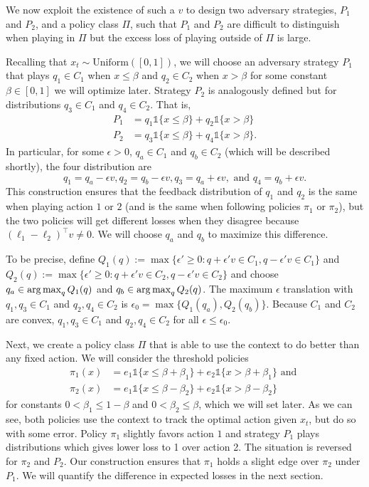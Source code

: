 \documentclass{article}
\begin{document}
We now exploit the existence of such a $v$ to design two adversary strategies, $P_1$ and $P_2$, and a policy class $\Pi$, such that $P_1$ and $P_2$ are difficult to distinguish when playing in $\Pi$ but the excess loss of playing outside of $\Pi$ is large.

Recalling that $x_t\sim\mathrm{Uniform}([0,1])$, we will choose an adversary strategy $P_1$ that plays $q_1\in C_1$ when  $x\leq \beta$ and $q_2 \in C_2$ when $x>\beta$ for some constant $\beta\in [0,1]$ we will optimize later. Strategy $P_2$ is analogously defined but for distributions $q_3 \in C_1$ and $q_4 \in C_2$. That is,
\begin{align*}
    P_1 &= q_1 \mathds{1}\{ x \leq \beta\} + q_2 \mathds{1}\{ x > \beta\}\\
    P_2 &= q_3 \mathds{1}\{ x \leq \beta\} + q_4 \mathds{1}\{ x > \beta\}.
\end{align*}
In particular, for some $\epsilon>0$, $q_a \in C_1$ and $q_b \in C_2$ (which will be described shortly), the four distribution are 
\begin{equation}
  q_1 = q_a - \epsilon v,
  q_2 = q_b - \epsilon v,
  q_3 = q_a + \epsilon v,\text{ and }
  q_4 = q_b + \epsilon v.
\end{equation}
This construction ensures that the feedback distribution of $q_1$ and $q_2$ is the same when playing action $1$ or $2$ (and is the same when following policies $\pi_1$ or $\pi_2$), but the two policies will get different losses when they disagree because $(\ell_1 - \ell_2)^\top v \neq 0$. We will choose $q_a$ and $q_b$ to maximize this difference.

To be precise, define
$Q_1(q) := \max \{\epsilon'\geq 0: q+\epsilon' v \in C_1, q - \epsilon'v \in C_1\}$
and
$Q_2(q) := \max \{\epsilon'\geq 0: q+\epsilon' v \in C_2, q-\epsilon' v \in C_2 \}$
and choose $q_a \in\operatorname*{arg\,max}_q Q_1(q)$ and $q_b \in \operatorname*{arg\,max}_q Q_2(q)$. The maximum $\epsilon$ translation with $q_1,q_3\in C_1$ and $q_2,q_4\in C_2$ is $\epsilon_0 = \max\{ Q_1(q_a),Q_2(q_b)\}$. Because $C_1$ and $C_2$ are convex, $q_1,q_3\in C_1$ and $q_2,q_4\in C_2$ for all $\epsilon \leq \epsilon_0$.

Next, we create a policy class $\Pi$ that is able to use the context to do better than any fixed action. We will consider the threshold policies 
\begin{align*}
  \pi_1(x) &= e_1 \mathds{1}\{ x \leq \beta + \beta_1\} + e_2 \mathds{1}\{ x > \beta+\beta_1\} \text{ and }\\
  \pi_2(x) &= e_1 \mathds{1}\{ x \leq \beta - \beta_2\} + e_2 \mathds{1}\{ x > \beta-\beta_2\}
\end{align*}
for constants $0 < \beta_1 \leq 1- \beta$ and $0 < \beta_2 \leq \beta$, which we will set later. As we can see, both policies use the context to track the optimal action given $x_t$, but do so with some error. Policy $\pi_1$ slightly favors action $1$ and strategy $P_1$ plays distributions which gives lower loss to 1 over action 2. The situation is reversed for $\pi_2$ and $P_2$. Our construction ensures that $\pi_1$ holds a slight edge over $\pi_2$ under $P_1$. We will quantify the difference in expected losses in the next section.
\end{document}

